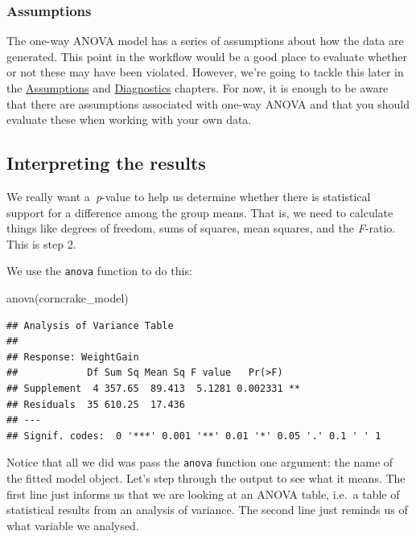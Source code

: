 \documentclass[
]{book}
\newenvironment{Shaded}{\begin{snugshade}}{\end{snugshade}}
\newcommand{\FunctionTok}[1]{\textcolor[rgb]{0.00,0.00,0.00}{#1}}
\newcommand{\NormalTok}[1]{#1}
\newenvironment{greybox}{
  \definecolor{shadecolor}{rgb}{0.95,0.95,0.95}  %
  \color{black}
  \begin{shaded}}
 {\end{shaded}}
\newenvironment{infobox}[1]
  {
  \begin{itemize}
  \renewcommand{\labelitemi}{
    \raisebox{-.7\height}[0pt][0pt]{
      {\setkeys{Gin}{width=3em,keepaspectratio}
        \texttt{[image: images/\#1]}}
    }
  }
  \setlength{\fboxsep}{1em}
  \begin{greybox}
  \item
  }
  {
  \end{greybox}
  \end{itemize}
  }
\begin{document}
\begin{infobox}{warning}

\hypertarget{assumptions-1}{%
\subsubsection*{Assumptions}\label{assumptions-1}}

The one-way ANOVA model has a series of assumptions about how the data are generated. This point in the workflow would be a good place to evaluate whether or not these may have been violated. However, we're going to tackle this later in the \protect\hyperlink{assumptions-diagnostics}{Assumptions} and \protect\hyperlink{regression-diagnostics}{Diagnostics} chapters. For now, it is enough to be aware that there are assumptions associated with one-way ANOVA and that you should evaluate these when working with your own data.

\end{infobox}

\hypertarget{interpreting-the-results}{%
\subsection{Interpreting the results}\label{interpreting-the-results}}

We really want a~\emph{p}-value to help us determine whether there is statistical support for a difference among the group means. That is, we need to calculate things like degrees of freedom, sums of squares, mean squares, and the \emph{F}-ratio. This is step 2.

We use the \texttt{anova} function to do this:

\begin{Shaded}
\begin{Highlighting}[]
\FunctionTok{anova}\NormalTok{(corncrake\_model)}
\end{Highlighting}
\end{Shaded}

\begin{verbatim}
## Analysis of Variance Table
## 
## Response: WeightGain
##            Df Sum Sq Mean Sq F value   Pr(>F)   
## Supplement  4 357.65  89.413  5.1281 0.002331 **
## Residuals  35 610.25  17.436                    
## ---
## Signif. codes:  0 '***' 0.001 '**' 0.01 '*' 0.05 '.' 0.1 ' ' 1
\end{verbatim}

Notice that all we did was pass the \texttt{anova} function one argument: the name of the fitted model object. Let's step through the output to see what it means. The first line just informs us that we are looking at an ANOVA table, i.e.~a table of statistical results from an analysis of variance. The second line just reminds us of what variable we analysed.
\end{document}

